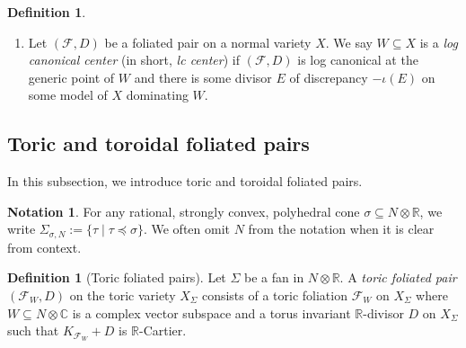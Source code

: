 \documentclass[12pt,reqno]{amsart}
\DeclareMathOperator{\ve}{\varepsilon}
\theoremstyle{definition}
\newtheorem{notation}[theorem]{Notation}
\newtheorem{definition}[theorem]{Definition}
\newcommand\cF{{\mathcal{F}}}
\newcommand\bC{{\mathbb C}}
\newcommand\bR{{\mathbb R}}
\begin{document}
\begin{definition}
\begin{enumerate}
    Let $Z$ be an irreducible subvariety of $X$. 
    We say that the foliated pair $(\cF,D)$ is terminal (resp. canonical, log terminal, log canonical, $\ve$-log canonical) at the \emph{generic} point of $Z$ if it is such at $\eta_Z$, the generic point of $Z$. 
    And we say that the foliated pair $(\cF,D)$ is terminal (resp. canonical, log terminal, log canonical, $\ve$-log canonical) at the \emph{general} point of $Z$ if it is such at the general \emph{closed} point of $Z$. 

    We say $\cF$ is terminal (resp. canonical, log terminal, log canonical, $\ve$-log canonical) if the foliated pair $(\cF,0)$ is such. 

    \item Let $(\cF,D)$ be a foliated pair on a normal variety $X$. 
    We say $W\subseteq X$ is a \emph{log canonical center} (in short, \emph{lc center}) if $(\cF,D)$ is log canonical at the generic point of $W$ and there is some divisor $E$ of discrepancy $-\iota(E)$ on some model of $X$ dominating $W$. 
\end{enumerate}
\end{definition}




\subsection{Toric and toroidal foliated pairs}
In this subsection, we introduce toric and toroidal foliated pairs. 

\begin{notation}\label{notation:FanGeneratedByACone}
    For any rational, strongly convex, polyhedral cone $\sigma\subseteq N\otimes\bR$, we write $\Sigma_{\sigma,N}:=\{\tau\mid\tau\preceq\sigma\}$. We often omit $N$ from the notation when it is clear from context.
\end{notation}

\begin{definition}[Toric foliated pairs]\label{tor_fol_pair_defn}
Let $\Sigma$ be a fan in $N\otimes\bR$.
A \emph{toric foliated pair} $(\cF_W,D)$ on the toric variety $X_\Sigma$ consists of a
toric foliation $\cF_W$ on $X_\Sigma$ where $W\subseteq N\otimes\bC$ is a complex vector subspace and a torus invariant $\bR$-divisor $D$ on $X_\Sigma$ such that $K_{\cF_W}+D$ is $\bR$-Cartier. 
\end{definition}
\end{document}
